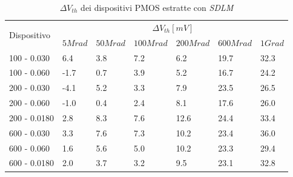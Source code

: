 \documentclass[12pt, letterpaper]{book}
\begin{document}
\begin{table}[H]
  \renewcommand{\arraystretch}{1.3}
  \begin{tabular}{m{2.1cm}  m{1.1cm} m{1.3cm} m{1.5cm} m{1.5cm} m{1.5cm} m{1cm}}
    \toprule
    \multirow{2}{*}{Dispositivo} & \multicolumn{6}{c}{$\Delta V_{th} [mV] $}                                                          \\
    \cmidrule{2-7}
                                 & $5Mrad$                                   & $50Mrad$ & $100Mrad$ & $200Mrad$ & $600Mrad$ & $1Grad$ \\
    \midrule
    100 - 0.030                     & 6.4                                       & 3.8      & 7.2       & 6.2       & 19.7      & 32.3    \\
    \hline
    100 - 0.060                     & -1.7                                      & 0.7      & 3.9       & 5.2       & 16.7      & 24.2    \\
    \hline
    200 - 0.030                     & -4.1                                      & 5.2      & 3.3       & 7.9       & 23.5      & 26.5    \\
    \hline
    200 - 0.060                     & -1.0                                      & 0.4      & 2.4       & 8.1       & 17.6      & 26.0    \\
    \hline
    200 - 0.0180                    & 2.8                                       & 8.3      & 7.6       & 12.6      & 24.4      & 33.4    \\
    \hline
    600 - 0.030                     & 3.3                                       & 7.6      & 7.3       & 10.2      & 23.4      & 36.0    \\
    \hline
    600 - 0.060                     & 1.6                                       & 5.6      & 5.0       & 10.2      & 23.3      & 29.4    \\
    \hline
    600 - 0.0180                    & 2.0                                       & 3.7      & 3.2       & 9.5       & 23.1      & 32.8    \\
    \bottomrule
  \end{tabular}
  \caption{$\Delta V_{th}$ dei dispositivi PMOS estratte con \emph{SDLM}}
  \label{tab:deltaVthSDLMP}
\end{table}
\end{document}

